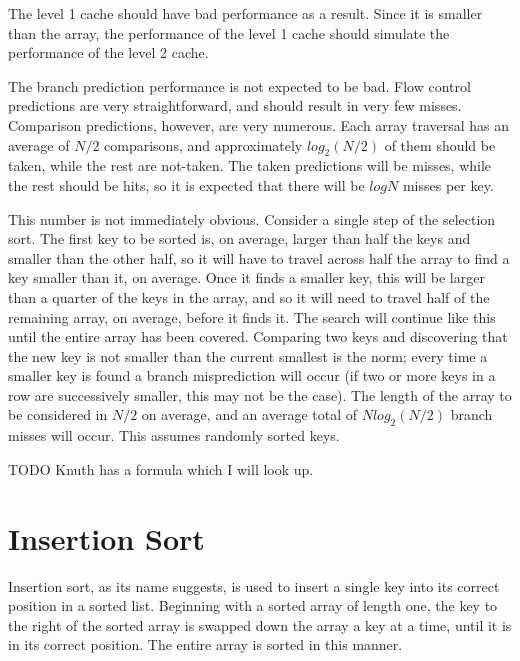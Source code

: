 The level 1 cache should have bad performance as a result. Since it is smaller
than the array, the performance of the level 1 cache should simulate the
performance of the level 2 cache.

\label{selection branches logn}
The branch prediction performance is not expected to be bad. Flow control
predictions are very straightforward, and should result in very few misses.
Comparison predictions, however, are very numerous. Each array traversal has an
average of $N/2$ comparisons, and approximately $log_2(N/2)$ of them should be
taken, while the rest are not-taken. The taken predictions will be misses,
while the rest should be hits, so it is expected that there will be $logN$
misses per key.

This number is not immediately obvious. Consider a single step of the selection
sort. The first key to be sorted is, on average, larger than half the keys and
smaller than the other half, so it will have to travel across half the array to
find a key smaller than it, on average. Once it finds a smaller key, this will
be larger than a quarter of the keys in the array, and so it will need to travel
half of the remaining array, on average, before it finds it. The search will
continue like this until the entire array has been covered. Comparing two keys
and discovering that the new key is not smaller than the current smallest is the
norm; every time a smaller key is found a branch misprediction will occur (if
two or more keys in a row are successively smaller, this may not be the case).
The length of the array to be considered in $N/2$ on average, and an average
total of $Nlog_2(N/2)$ branch misses will occur. This assumes randomly sorted
keys.

TODO Knuth has a formula which I will look up.

\section{Insertion Sort}

Insertion sort, as its name suggests, is used to insert a single key into its
correct position in a sorted list. Beginning with a sorted array of length one,
the key to the right of the sorted array is swapped down the array a key at a
time, until it is in its correct position. The entire array is sorted in this
manner.

